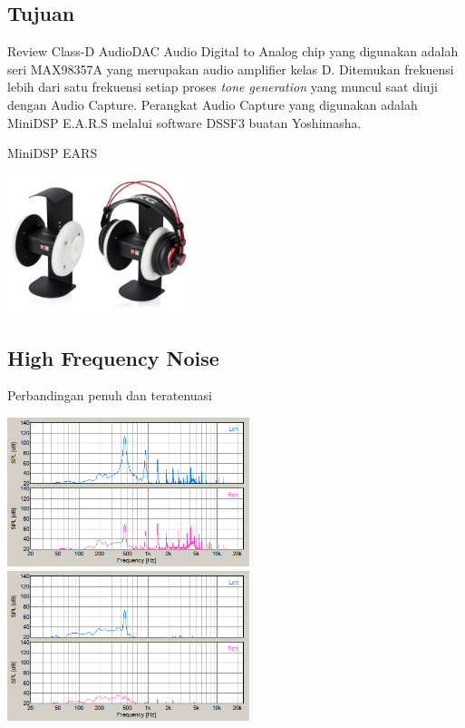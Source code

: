 \documentclass[table,dvipsnames]{beamer}
\begin{document}
	\begin{frame}
		\subsection{Tujuan}
		\begin{exampleblock}{Review Class-D AudioDAC}
			Audio Digital to Analog chip yang digunakan adalah seri MAX98357A yang merupakan audio amplifier kelas D.
			Ditemukan frekuensi lebih dari satu frekuensi setiap proses \textit{tone generation} yang muncul saat diuji dengan Audio Capture.
			Perangkat Audio Capture yang digunakan adalah MiniDSP E.A.R.S melalui software DSSF3 buatan Yoshimasha.
		\end{exampleblock}

		\begin{exampleblock}{MiniDSP EARS}
			\begin{center}
				\includegraphics[width=150pt]{images/ears}
			\end{center}
		\end{exampleblock}
	\end{frame}

	\begin{frame}
		\subsection{High Frequency Noise}
		\begin{exampleblock}{Perbandingan penuh dan teratenuasi}
			\begin{center}
				\includegraphics[width=200pt]{images/notattenuated}
				\includegraphics[width=200pt]{images/attenuated}
			\end{center}
		\end{exampleblock}
	\end{frame}
\end{document}
